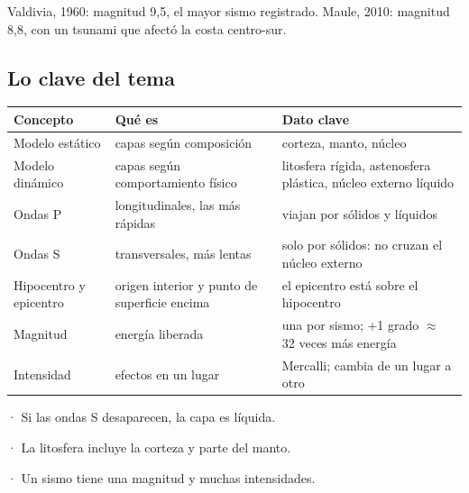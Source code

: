 \begin{ejemplo} Valdivia, 1960: magnitud 9,5, el mayor sismo registrado. Maule, 2010: magnitud 8,8, con un tsunami que afectó la costa centro-sur.\end{ejemplo}
\subsection{Lo clave del tema}
\begin{center}\small
\begin{tabularx}{\linewidth}{@{}>{\raggedright\arraybackslash\hsize=0.65\hsize}X>{\raggedright\arraybackslash\hsize=1.18\hsize}X>{\raggedright\arraybackslash\hsize=1.18\hsize}X@{}}
\toprule
\textbf{Concepto} & \textbf{Qué es} & \textbf{Dato clave} \\
\midrule
Modelo estático & capas según composición & corteza, manto, núcleo \\
Modelo dinámico & capas según comportamiento físico & litosfera rígida, astenosfera plástica, núcleo externo líquido \\
Ondas P & longitudinales, las más rápidas & viajan por sólidos y líquidos \\
Ondas S & transversales, más lentas & solo por sólidos: no cruzan el núcleo externo \\
Hipocentro y epicentro & origen interior y punto de superficie encima & el epicentro está sobre el hipocentro \\
Magnitud & energía liberada & una por sismo; +1 grado \ensuremath{\approx} 32 veces más energía \\
Intensidad & efectos en un lugar & Mercalli; cambia de un lugar a otro \\
\bottomrule
\end{tabularx}
\end{center}
 
\begin{clave}[{Recuerda}] · Si las ondas S desaparecen, la capa es líquida.\par · La litosfera incluye la corteza y parte del manto.\par · Un sismo tiene una magnitud y muchas intensidades.\end{clave}
 
